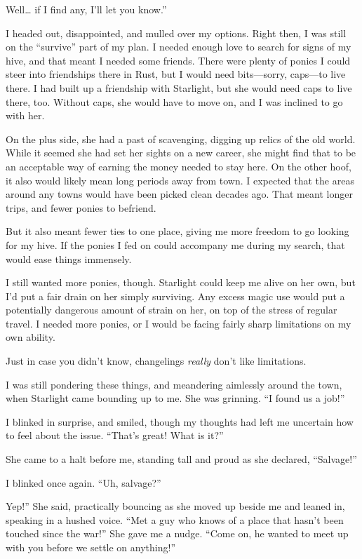 \leavevmode{}Well… if I find any, I’ll let you know.”

I headed out, disappointed, and mulled over my options. Right then, I was still on the “survive” part of my plan. I needed enough love to search for signs of my hive, and that meant I needed some friends. There were plenty of ponies I could steer into friendships there in Rust, but I would need bits—sorry, caps—to live there. I had built up a friendship with Starlight, but she would need caps to live there, too. Without caps, she would have to move on, and I was inclined to go with her.

On the plus side, she had a past of scavenging, digging up relics of the old world. While it seemed she had set her sights on a new career, she might find that to be an acceptable way of earning the money needed to stay here. On the other hoof, it also would likely mean long periods away from town. I expected that the areas around any towns would have been picked clean decades ago. That meant longer trips, and fewer ponies to befriend.

But it also meant fewer ties to one place, giving me more freedom to go looking for my hive. If the ponies I fed on could accompany me during my search, that would ease things immensely.

I still wanted more ponies, though. Starlight could keep me alive on her own, but I’d put a fair drain on her simply surviving. Any excess magic use would put a potentially dangerous amount of strain on her, on top of the stress of regular travel. I needed more ponies, or I would be facing fairly sharp limitations on my own ability.

Just in case you didn’t know, changelings \textit{really} don’t like limitations.

I was still pondering these things, and meandering aimlessly around the town, when Starlight came bounding up to me. She was grinning. “I found us a job!”

I blinked in surprise, and smiled, though my thoughts had left me uncertain how to feel about the issue. “That’s great! What is it?”

She came to a halt before me, standing tall and proud as she declared, “Salvage!”

I blinked once again. “Uh, salvage?”

\leavevmode{}Yep!” She said, practically bouncing as she moved up beside me and leaned in, speaking in a hushed voice. “Met a guy who knows of a place that hasn’t been touched since the war!” She gave me a nudge. “Come on, he wanted to meet up with you before we settle on anything!”

